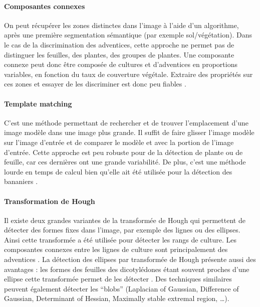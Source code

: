 \documentclass[../thesis.tex]{subfiles}
\begin{document}
    
    \paragraph{Composantes connexes} On peut récupérer les zones distinctes dans l'image à l'aide d'un algorithme, après une première segmentation sémantique (par exemple sol/végétation). Dans le cas de la discrimination des adventices, cette approche ne permet pas de distinguer les feuilles, des plantes, des groupes de plantes. Une composante connexe peut donc être composée de cultures et d'adventices en proportions variables, en fonction du taux de couverture végétale. Extraire des propriétés sur ces zones et essayer de les discriminer est donc peu fiables \cite{rs10050761}.
    
    \paragraph{Template matching} C'est une méthode permettant de rechercher et de trouver l'emplacement d'une image modèle dans une image plus grande. Il suffit de faire glisser l'image modèle sur l'image d'entrée et de comparer le modèle et avec la portion de l'image d'entrée. Cette approche est peu robuste pour de la détection de plante ou de feuille, car ces dernières ont une grande variabilité. De plus, c'est une méthode lourde en temps de calcul bien qu'elle ait été utilisée pour la détection des bananiers \cite{ZHOU201458}.
    
    \paragraph{Transformation de Hough} Il existe deux grandes variantes de la transformée de Hough qui permettent de détecter des formes fixes dans l'image, par exemple des lignes ou des ellipses. Ainsi cette transformée a été utilisée pour détecter les rangs de culture. Les composantes connexes entre les lignes de culture sont principalement des adventices \cite{rs10050761}. La détection des ellipses par transformée de Hough présente aussi des avantages : les formes des feuilles des dicotylédones étant souvent proches d'une ellipse cette transformée permet de les détecter \cite{Kumar2018, zhonghua2020automatic}. Des techniques similaires peuvent également détecter les ``blobs'' (Laplacian of Gaussian, Difference of Gaussian, Determinant of Hessian, Maximally stable extremal region, \dots).
    
    \newpage
\end{document}
